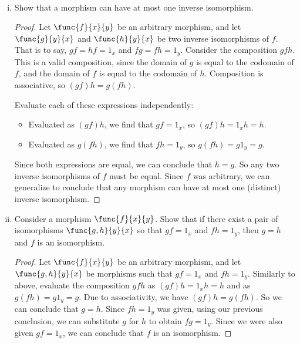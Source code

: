 \documentclass[main.tex]{subfiles}
\begin{document}
\paragraph{}
\begin{exercise}\leavevmode
	\begin{enumerate}[(i)]
		\item Show that a morphism can have at most one inverse isomorphism.
			\begin{proof}
				Let \(\func{f}{x}{y}\) be an arbitrary morphism, and let
				\(\func{g}{y}{x}\) and \(\func{h}{y}{x}\) be two inverse
				isomorphisms of \(f\). That is to say, \(gf=hf=1_{x}\) and
				\(fg=fh=1_{y}\). Consider the composition \(gfh\). This is a
				valid composition, since the domain of \(g\) is equal to the
				codomain of \(f\), and the domain of \(f\) is equal to the
				codomain of \(h\). Composition is associative, so \((gf)h =
				g(fh)\).

				Evaluate each of these expressions independently:
				\begin{itemize}
					\item Evaluated as \((gf)h\), we find that \(gf=1_{x}\), so
						\((gf)h=1_{x}h=h\).
					\item Evaluated as \(g(fh)\), we find that \(fh=1_{y}\), so
						\(g(fh)=g1_{y}=g\).
				\end{itemize}

				Since both expressions are equal, we can conclude that \(h=g\).
				So any two inverse isomorphisms of \(f\) must be equal. Since
				\(f\) was arbitrary, we can generalize to conclude that any
				morphism can have at most one (distinct) inverse isomorphism.
			\end{proof}

		\item Consider a morphism \(\func{f}{x}{y}\). Show that if there exist a
			pair of isomorphisms \(\func{g,h}{y}{x}\) so that \(gf=1_{x}\) and
			\(fh=1_{y}\), then \(g=h\) and \(f\) is an isomorphism.\\
			\begin{proof}
				Let \(\func{f}{x}{y}\) be an arbitrary morphism, and let
				\(\func{g,h}{y}{x}\) be morphisms such that \(gf=1_{x}\) and
				\(fh=1_{y}\). Similarly to above, evaluate the composition
				\(gfh\) as \((gf)h=1_{x}h=h\) and as \(g(fh)=g1_{y}=g\). Due to
				associativity, we have \((gf)h=g(fh)\). So we can conclude that \(g=h\).
				Since \(fh=1_{y}\) was given, using our previous conclusion, we can
				substitute \(g\) for \(h\) to obtain \(fg=1_{y}\). Since we were
				also given \(gf=1_{x}\), we can conclude that \(f\) is an
				isomorphism.
			\end{proof}
	\end{enumerate}
\end{exercise}
\end{document}
